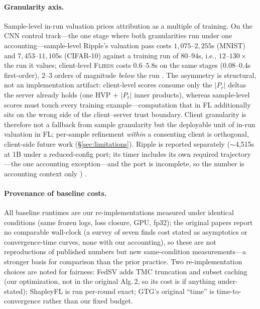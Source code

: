 \paragraph{Granularity axis.}
Sample-level in-run valuation prices attribution as a multiple of training. On
the CNN control track---the one stage where both granularities run under one
accounting---sample-level Ripple's valuation pass costs $1{,}075$--$2{,}255$s
(MNIST) and $7{,}453$--$11{,}105$s (CIFAR-10) against a training run of
$80$--$94$s, i.e., $12$--$130\times$ the run it values; client-level
\textsc{Flirds} costs $0.6$--$5.8$s on the same stages ($0.08$--$0.4$s
first-order), $2$--$3$ orders of magnitude \emph{below} the run
. The asymmetry is structural,
not an implementation artifact: client-level scores consume only the $|P_r|$
deltas the server already holds (one HVP $+$ $|P_r|$ inner products), whereas
sample-level scores must touch every training example---computation that in FL
additionally sits on the wrong side of the client--server trust boundary.
Client granularity is therefore not a fallback from sample granularity but the
deployable unit of in-run valuation in FL; per-sample refinement \emph{within}
a consenting client is orthogonal, client-side future work
(\S\ref{sec:limitations}). Ripple is reported separately
($\sim$4{,}515s at 1B under a reduced-config port; its timer includes its own
required trajectory---the one accounting exception---and the port is
incomplete, so the number is accounting context only ) .

\paragraph{Provenance of baseline costs.} All baseline runtimes are our
re-implementations measured under identical conditions (same frozen logs, loss
closure, GPU, fp32); the original papers report no comparable wall-clock (a
survey of seven finds cost stated as asymptotics or convergence-time curves, none
with our accounting), so these are not reproductions of published numbers but
new same-condition measurements---a stronger basis for comparison than the prior
practice. Two re-implementation choices are noted for fairness: FedSV adds TMC
truncation and subset caching (our optimization, not in the original Alg.\,2, so
its cost is if anything under-stated); ShapleyFL is run per-round exact; GTG's
original ``time'' is time-to-convergence rather than our fixed budget.

